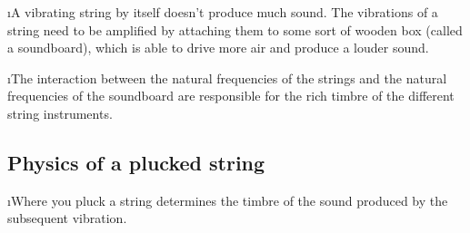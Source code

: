 \i A vibrating string by itself doesn't produce 
much sound.
The vibrations of a string need to be amplified 
by attaching them to some sort of wooden box 
(called a soundboard), 
which is able to drive more air and produce a louder sound.

\i The interaction between the natural frequencies 
of the strings and the natural frequencies of the 
soundboard are responsible for the rich timbre of the
different string instruments.

\ei
\subsection{Physics of a plucked string}
\bi

\i Where you pluck a string determines the timbre
of the sound produced by the subsequent vibration.

